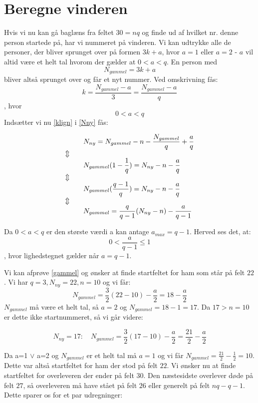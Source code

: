 \section{Beregne vinderen}
Hvis vi nu kan gå baglæns fra feltet \(30=nq\) og finde ud af hvilket nr. denne person startede på, har vi nummeret på vinderen. Vi kan udtrykke alle de personer, der bliver sprunget over på formen \(3k+a\), hvor \(a=1\) eller \(a=2\) - \(a\) vil altid være et helt tal hvorom der gælder at \(0<a<q\). En person med 
\[N_{gammel}=3k+a\] 
bliver altså sprunget over og får et nyt nummer. Ved omskrivning fås:
\begin{equation}
k=\frac{N_{gammel}-a}{3}=\frac{N_{gammel}-a}{q}\label{klign}
\end{equation}
, hvor
\[0 < a < q\]
Indsætter vi nu \ref{klign} i \ref{Nny} fås:

\begin{alignat}{2}
&&&N_{ny}=N_{gammel}-n-\frac{N_{gammel}}{q}+\frac{a}{q}\\
\ArrowBetweenLines
&&&N_{gammel}(1-\frac{1}{q})=N_{ny}-n-\frac{a}{q}\\
\ArrowBetweenLines
&&&N_{gammel}(\frac{q-1}{q})=N_{ny}-n-\frac{a}{q}\\
\ArrowBetweenLines
&&&N_{gammel}=\frac{q}{q-1}(N_{ny}-n)-\frac{a}{q-1}\label{gammel}
\end{alignat}

Da \(0 < a < q\) er den største værdi a kan antage \(a_{max}=q-1\). Herved ses det, at:
\[0 < \frac{a}{q-1} \leq 1\], hvor lighedstegnet gælder når \(a=q-1\).

Vi kan afprøve \ref{gammel} og ønsker at finde startfeltet for ham som står på felt \(22\). Vi har \(q=3, N_{ny}=22, n=10\) og vi får:
\[N_{gammel}=\frac{3}{2}(22-10)-\frac{a}{2}=18-\frac{a}{2}\]
\(N_{gammel}\) må være et helt tal, så \(a=2\) og \(N_{gammel}=18-1=17\). Da \(17>n=10\) er dette ikke startnummeret, så vi går videre:

\[N_{ny}=17: \quad N_{gammel}=\frac{3}{2}(17-10)-\frac{a}{2}=\frac{21}{2}-\frac{a}{2}\]

Da a=1 \(\lor\) a=2 og \(N_{gammel}\) er et helt tal må \(a=1\) og vi får \(N_{gammel}=\frac{21}{2}-\frac{1}{2}=10\). Dette var altså startfeltet for ham der stod på felt \(22\). Vi ønsker nu at finde startfeltet for overleveren der ender på felt \(30\). Den næstesidste overlever døde på felt \(27\), så overleveren må have stået på felt \(26\) eller generelt på felt \(nq-q-1\). Dette sparer os for et par udregninger:

